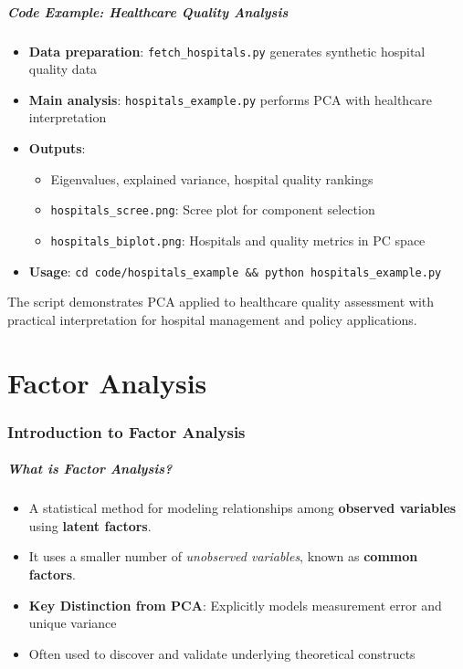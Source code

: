 \documentclass[aspectratio=169]{beamer}
\begin{document}
\begin{frame}
    \frametitle{Code Example: Healthcare Quality Analysis}
    \begin{itemize}
        \item \textbf{Data preparation}: \texttt{fetch\_hospitals.py} generates synthetic hospital quality data \pause
        \item \textbf{Main analysis}: \texttt{hospitals\_example.py} performs PCA with healthcare interpretation \pause
        \item \textbf{Outputs}:
              \begin{itemize}
                  \item Eigenvalues, explained variance, hospital quality rankings \pause
                  \item \texttt{hospitals\_scree.png}: Scree plot for component selection \pause
                  \item \texttt{hospitals\_biplot.png}: Hospitals and quality metrics in PC space \pause
              \end{itemize}
        \item \textbf{Usage}: \texttt{cd code/hospitals\_example \&\& python hospitals\_example.py} \pause
    \end{itemize}
    \vspace{6pt}
    The script demonstrates PCA applied to healthcare quality assessment with practical interpretation for hospital management and policy applications.
\end{frame}


\part{Factor Analysis}

\begin{frame}
    \partpage
\end{frame}

\section{Introduction to Factor Analysis}

\begin{frame}[fragile]
    \frametitle{What is Factor Analysis?}
    \begin{itemize}
        \item A statistical method for modeling relationships among \textbf{observed variables} using \textbf{latent factors}. \pause
        \item It uses a smaller number of \textit{unobserved variables}, known as \textbf{common factors}. \pause
        \item \textbf{Key Distinction from PCA}: Explicitly models measurement error and unique variance \pause
        \item Often used to discover and validate underlying theoretical constructs
    \end{itemize}
\end{frame}
\end{document}
